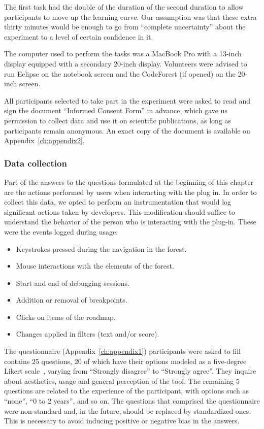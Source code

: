 The first task had the double of the duration of the second duration to
allow participants to move up the learning curve. Our assumption was that these extra
thirty minutes would be enough to go from ``complete uncertainty'' about the
experiment to a level of certain confidence in it.

The computer used to perform the tasks was a MacBook Pro with a 13-inch display
equipped with a secondary 20-inch display. Volunteers were advised to run
Eclipse on the notebook screen and the CodeForest (if opened) on the 20-inch
screen.

All participants selected to take part in the experiment were asked to read and
sign the document ``Informed Consent Form'' in advance, which gave us permission
to collect data and use it on scientific publications, as long as participants
remain anonymous. An exact copy of the document is available on
Appendix~\ref{ch:appendix2}.

\subsubsection{Data collection}

Part of the answers to the questions formulated at the beginning of this chapter
are the actions performed by users when interacting with the plug in. In order
to collect this data, we opted to perform an instrumentation that would log
significant actions taken by developers. This modification should suffice to
understand the behavior of the person who is interacting with the plug-in. These
were the events logged during usage:

\begin{itemize}
  \item Keystrokes pressed during the navigation in the forest.
  \item Mouse interactions with the elements of the forest.
  \item Start and end of debugging sessions.
  \item Addition or removal of breakpoints.
  \item Clicks on items of the roadmap.
  \item Changes applied in filters (text and/or score).
\end{itemize}

The questionnaire (Appendix~\ref{ch:appendix1}) participants were asked to fill
contains 25 questions, 20 of which have their options modeled as a five-degree
Likert scale~\cite{albaum1997likert}, varying from ``Strongly disagree'' to
``Strongly agree''. They inquire about aesthetics, usage and general perception
of the tool. The remaining 5 questions are related to the experience of the
participant, with options such as ``none'', ``0 to 2 years'', and so on.
The questions that comprised the questionnaire were non-standard and, in
the future, should be replaced by standardized ones. This is necessary to
avoid inducing positive or negative bias in the answers.

